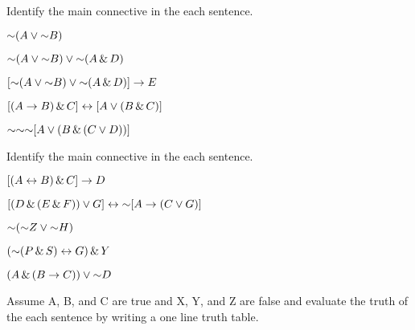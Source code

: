 \practiceproblems
\noindent\noindent\problempart Identify the main connective in the each sentence.
\begin{earg}
\item $\mathord{\sim}(A \vee \mathord{\sim} B) $  %
\item $\mathord{\sim}(A \vee \mathord{\sim} B) \vee \mathord{\sim}(A \,\&\, D)$	%
\item $[ \mathord{\sim}(A \vee \mathord{\sim} B) \vee \mathord{\sim} (A \,\&\, D)] \rightarrow E$	%
\item $[(A \rightarrow B) \,\&\, C] \leftrightarrow [A \vee (B \,\&\, C)]$  %
\item $\mathord{\sim} \mathord{\sim} \mathord{\sim} [A \vee (B \,\&\, (C \vee D))] $ %
\end{earg}

\noindent\problempart Identify the main connective in the each sentence.
\begin{earg}

\item $[(A \leftrightarrow B) \,\&\, C] \rightarrow D$  %

\item $[(D \,\&\, (E \,\&\, F)) \vee G] \leftrightarrow  \mathord{\sim} [A \rightarrow (C \vee G)] $ %

\item $\mathord{\sim} (\mathord{\sim} Z \vee \mathord{\sim} H) $ %

\item $(\mathord{\sim} (P \,\&\, S) \leftrightarrow G) \,\&\, Y $ %

\item $(A \,\&\, (B \rightarrow C)) \vee \mathord{\sim} D	$  %

\end{earg}

\noindent\problempart Assume A, B, and C are true and X, Y, and Z are false and evaluate the truth of the each sentence by writing a one line truth table.

